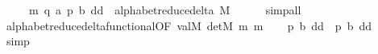 \begin{isabellebody}
\ \ \ \ \ m{}{\isacharcolon}{\kern0pt}\ {\isachardoublequoteopen}{\isacharparenleft}{\kern0pt}q{\isacharcomma}{\kern0pt}\ a{\isacharcomma}{\kern0pt}\ p{}{\isacharcomma}{\kern0pt}\ b{}{\isacharcomma}{\kern0pt}\ dd{}{\isacharparenright}{\kern0pt}\ {\isasymin}\ alphabet{\isacharunderscore}{\kern0pt}reduce{\isacharunderscore}{\kern0pt}delta\ M{\isachardoublequoteclose}\isanewline
\ \ \ \ \isamarkupfalse%
\ simp{\isacharunderscore}{\kern0pt}all\isanewline
\ \ \isamarkupfalse%
\ alphabet{\isacharunderscore}{\kern0pt}reduce{\isacharunderscore}{\kern0pt}delta{\isacharunderscore}{\kern0pt}functional{\isacharbrackleft}{\kern0pt}OF\ valM\ detM\ m{}\ m{}{\isacharbrackright}{\kern0pt}\isanewline
\ \ \isamarkupfalse%
\ {\isachardoublequoteopen}{\isacharparenleft}{\kern0pt}p{}{\isacharcomma}{\kern0pt}\ b{}{\isacharcomma}{\kern0pt}\ dd{}{\isacharparenright}{\kern0pt}\ {\isacharequal}{\kern0pt}\ {\isacharparenleft}{\kern0pt}p{}{\isacharcomma}{\kern0pt}\ b{}{\isacharcomma}{\kern0pt}\ dd{}{\isacharparenright}{\kern0pt}{\isachardoublequoteclose}\ \isamarkupfalse%
\ simp\isanewline
{}\isamarkupfalse%
%
\endisatagproof
{\isafoldproof}%
%
\isadelimproof
\isanewline
%
\endisadelimproof
%
\isadelimtheory
\isanewline
%
\endisadelimtheory
%
\isatagtheory
{}\isamarkupfalse%
%
\endisatagtheory
{\isafoldtheory}%
%
\isadelimtheory
%
\endisadelimtheory
%
\end{isabellebody}%
\endinput
